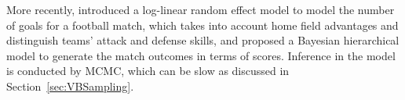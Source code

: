 More recently, \cite{Baio:10JAS} introduced a log-linear random effect model to model the number of goals for a football match, which takes into account home field advantages and distinguish teams' attack and defense skills, and proposed a Bayesian hierarchical model to generate the match outcomes in terms of scores. Inference in the model is conducted by MCMC, which can be slow as discussed in Section~\ref{sec:VBSampling}.